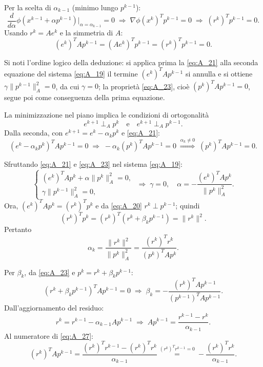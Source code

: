 \documentclass[a4paper,12pt]{article}
\numberwithin{equation}{section}
\numberwithin{figure}{section}
\numberwithin{table}{section}
\begin{document}
Per la scelta di \(\alpha_{k-1}\) (minimo lungo \(p^{k-1}\)):
\[
\frac{d}{d\alpha}\phi(x^{k-1}+\alpha p^{k-1})\big|_{\alpha=\alpha_{k-1}}=0
\;\Longrightarrow\;
\nabla\phi(x^k)^T p^{k-1}=0
\;\Longrightarrow\;
(r^k)^T p^{k-1}=0. \tag{A.20}\label{eq:A_20}
\]
Usando \(r^k=Ae^k\) e la simmetria di \(A\):
\[
(e^k)^T A p^{k-1}=(Ae^k)^T p^{k-1}=(r^k)^T p^{k-1}=0. \tag{A.21}\label{eq:A_21}
\]

Si noti l'ordine logico della deduzione: si applica prima la \eqref{eq:A_21} alla seconda equazione del sistema \eqref{eq:A_19} il termine $(e^k)^T A p^{k-1}$ si annulla e si ottiene \(\gamma\|p^{k-1}\|_A^2 = 0\), da cui \(\gamma = 0\); la proprietà \eqref{eq:A_23}, cioè \((p^k)^T A p^{k-1} = 0\), segue poi come conseguenza della prima equazione.

La minimizzazione nel piano implica le condizioni di ortogonalità
\[
e^{k+1} \perp_A p^k \quad \text{e} \quad e^{k+1} \perp_A p^{k-1}. \tag{A.22}\label{eq:A_22}
\]
Dalla seconda, con \(e^{k+1}=e^k-\alpha_k p^k\) e \eqref{eq:A_21}:
\[
(e^k-\alpha_k p^k)^T A p^{k-1}=0
\;\Longrightarrow\;
-\alpha_k (p^k)^T A p^{k-1}=0
\;\overset{\alpha_k\neq0}{\Longrightarrow}\;
(p^k)^T A p^{k-1}=0. \tag{A.23}\label{eq:A_23}
\]

Sfruttando \eqref{eq:A_21} e \eqref{eq:A_23} nel sistema \eqref{eq:A_19}:
\[
\begin{cases}
(e^k)^T A p^k+\alpha\|p^k\|_A^2=0,\\
\gamma\|p^{k-1}\|_A^2=0,
\end{cases}
\;\Longrightarrow\;
\gamma=0,\quad
\alpha=-\frac{(e^k)^T A p^k}{\|p^k\|_A^2}. \tag{A.24}\label{eq:A_24}
\]
Ora, \((e^k)^T A p^k=(r^k)^T p^k\) e da \eqref{eq:A_20} \(r^k\perp p^{k-1}\); quindi
\[
(r^k)^T p^k=(r^k)^T(r^k+\beta_k p^{k-1})=\|r^k\|^2. \tag{A.25}\label{eq:A_25}
\]
Pertanto
\[
\alpha_k=\frac{\|r^k\|^2}{\|p^k\|_A^2}
=\frac{(r^k)^T r^k}{(p^k)^T A p^k}. \tag{A.26}\label{eq:A_26}
\]

Per \(\beta_k\), da \eqref{eq:A_23} e \(p^k=r^k+\beta_k p^{k-1}\):
\[
(r^k+\beta_k p^{k-1})^T A p^{k-1}=0
\;\Longrightarrow\;
\beta_k=-\frac{(r^k)^T A p^{k-1}}{(p^{k-1})^T A p^{k-1}}. \tag{A.27}\label{eq:A_27}
\]
Dall'aggiornamento del residuo:
\[
r^k=r^{k-1}-\alpha_{k-1}A p^{k-1}
\;\Longrightarrow\;
A p^{k-1}=\frac{r^{k-1}-r^k}{\alpha_{k-1}}. \tag{A.28}\label{eq:A_28}
\]
Al numeratore di \eqref{eq:A_27}:
\[
(r^k)^T A p^{k-1}
=\frac{(r^k)^T r^{k-1}-(r^k)^T r^k}{\alpha_{k-1}}
\overset{(r^k)^T r^{k-1}=0}{=}
-\frac{(r^k)^T r^k}{\alpha_{k-1}}. \tag{A.29}\label{eq:A_29}
\]
\end{document}

